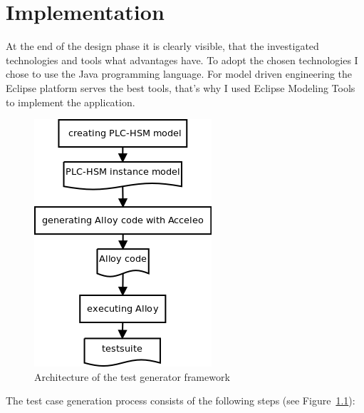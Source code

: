 \chapter{Implementation}
\label{cha:implementation}

At the end of the design phase it is clearly visible, that the investigated technologies and tools what advantages have. To adopt the chosen technologies I chose to use the Java programming language. For model driven engineering the Eclipse platform serves the best tools, that's why I used Eclipse Modeling Tools to implement the application.

\begin{figure}[htp]
\centering
\includegraphics[scale=0.5]{figures/testgenerator_architecture}
\caption{Architecture of the test generator framework}
\label{fig:testgenerator_architecture}
\end{figure}

The test case generation process consists of the following steps (see Figure~\ref{fig:testgenerator_architecture}):

